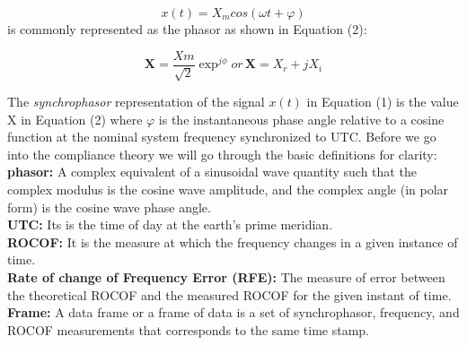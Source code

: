 \begin{equation}
x(t) = X_m cos(\omega t + \varphi)
\end{equation}
is commonly represented as the phasor as shown in Equation (2):

\begin{equation}
\textbf{X} = \frac{Xm}{\sqrt{2}}\exp^{j\phi}
or\hspace{2pt} \textbf{X} = X_r+jX_i
\end{equation}

The \textit{synchrophasor} representation of the signal $x(t)$ in Equation (1) is the value X in Equation (2) where $\varphi$ is the instantaneous phase angle relative to a cosine function at the nominal system frequency synchronized to UTC. Before we go into the compliance theory we will go through the basic definitions for clarity:\\
\textbf{phasor:} A complex equivalent of a sinusoidal wave quantity such that the complex modulus is the cosine wave amplitude, and the complex angle (in polar form) is the cosine wave phase angle.\\
\textbf{UTC:} Its is the time of day at the earth's prime meridian.\\
\textbf{ROCOF:} It is the measure at which the frequency changes in a given instance of time.\\
\textbf{Rate of change of Frequency Error (RFE):} The measure of error between the theoretical ROCOF and the measured ROCOF for the given instant of time.\\
\textbf{Frame:} A data frame or a frame of data is a set of synchrophasor, frequency, and ROCOF measurements that corresponds to the same time stamp.\\
